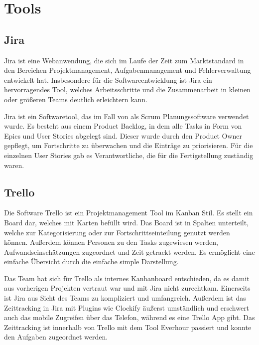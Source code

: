 
%


\section{Tools}\label{sec:tools}

\renewcommand{\kapitelautor}{Autor: Nils Hubmann}

\subsection{Jira}\label{subsec:jira}
%

\begin{coolQuote}
Jira ist eine Webanwendung, die sich im Laufe der Zeit zum Marktstandard in den Bereichen Projektmanagement, Aufgabenmanagement und Fehlerverwaltung entwickelt hat.
Insbesondere für die Softwareentwicklung ist Jira ein hervorragendes Tool, welches Arbeitsschritte und die Zusammenarbeit in kleinen oder größeren Teams deutlich erleichtern kann.
\end{coolQuote}

Jira ist ein Softwaretool, das im Fall von \ff als Scrum Planungssoftware verwendet wurde.
Es besteht aus einem Product Backlog, in dem alle Tasks in Form von Epics und User Stories abgelegt sind.
Dieser wurde durch den Product Owner gepflegt, um Fortschritte zu überwachen und die Einträge zu priorisieren.
Für die einzelnen User Stories gab es Verantwortliche, die für die Fertigstellung zuständig waren.


\subsection{Trello}\label{subsec:Trello}
%
Die Software Trello ist ein Projektmanagement Tool im Kanban Stil.
Es stellt ein Board dar, welches mit Karten befüllt wird.
Das Board ist in Spalten unterteilt, welche zur Kategorisierung oder zur Fortschrittseinteilung genutzt werden können.
Außerdem können Personen zu den Tasks zugewiesen werden, Aufwandseinschätzungen zugeordnet und Zeit getrackt werden.
Es ermöglicht eine einfache Übersicht durch die einfache simple Darstellung.

Das Team hat sich für Trello als internes Kanbanboard entschieden, da es damit aus vorherigen Projekten vertraut war und mit Jira nicht zurechtkam.
Einerseits ist Jira aus Sicht des Teams zu kompliziert und umfangreich.
Außerdem ist das Zeittracking in Jira mit Plugins wie Clockify äußerst umständlich und erschwert auch das mobile Zugreifen über das Telefon, während es eine Trello App gibt.
Das Zeittracking ist innerhalb von Trello mit dem Tool Everhour passiert und konnte den Aufgaben zugeordnet werden.

